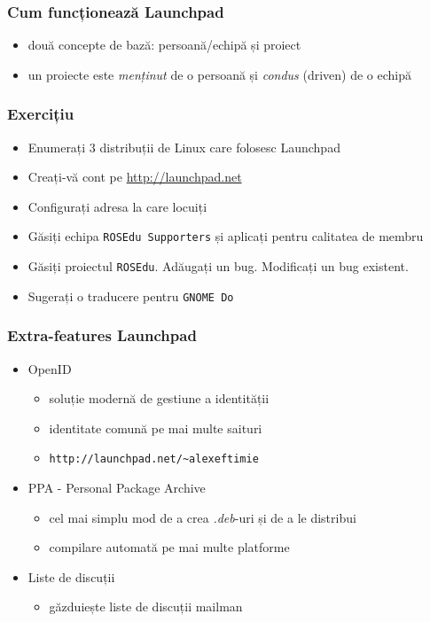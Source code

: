 \documentclass{beamer}
\begin{document}
\begin{frame}
\frametitle{Cum funcționează Launchpad}
\begin{itemize}
\item două concepte de bază: persoană/echipă și proiect
\item un proiecte este \emph{menținut} de o persoană și \emph{condus} (driven) de o echipă
\end{itemize}
\end{frame}

\begin{frame}
\frametitle{Exercițiu}
\begin{itemize}
\item Enumerați 3 distribuții de Linux care folosesc Launchpad
\item Creați-vă cont pe \url{http://launchpad.net}
\item Configurați adresa la care locuiți
\item Găsiți echipa \texttt{ROSEdu Supporters} și aplicați pentru calitatea de membru
\item Găsiți proiectul \texttt{ROSEdu}. Adăugați un bug. Modificați un bug existent.
\item Sugerați o traducere pentru \texttt{GNOME Do} %
\end{itemize}
\end{frame}

\begin{frame}
\frametitle{Extra-features Launchpad}
\begin{itemize}
\item OpenID
\begin{itemize}
\item soluție modernă de gestiune a identității
\item identitate comună pe mai multe saituri
\item \texttt{http://launchpad.net/\~{}alexeftimie}
\end{itemize}
\item PPA - Personal Package Archive
\begin{itemize}
\item cel mai simplu mod de a crea \emph{.deb}-uri și de a le distribui
\item compilare automată pe mai multe platforme
\end{itemize}
\item Liste de discuții
\begin{itemize}
\item găzduiește liste de discuții mailman
\end{itemize}
\end{itemize}
\end{frame}
\end{document}
